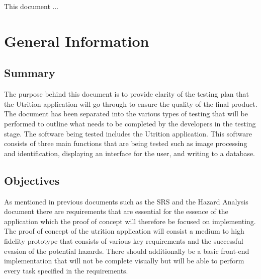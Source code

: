 \documentclass[12pt, titlepage]{article}
\begin{document}
	
	\newpage
	
	
	This document ... 
	
	\section{General Information}
	
	\subsection{Summary}
	
		The purpose behind this document is to provide clarity of the testing plan that the Utrition application will go through to ensure the quality of the final product. The document has been separated into the various types of testing that will be performed to outline what needs to be completed by the developers in the testing stage. The software being tested includes the Utrition application. This software consists of three main functions that are being tested such as image processing and identification, displaying an interface for the user, and writing to a database.
	
	\subsection{Objectives}
	
		
		As mentioned in previous documents such as the SRS and the Hazard Analysis document there are requirements that are essential for the essence of the application which the proof of concept will therefore be focused on implementing. The proof of concept of the utrition application will consist a medium to high fidelity prototype that consists of various key requirements and the successful evasion of the potential hazards. There should additionally be a basic front-end implementation that will not be complete visually but will be able to perform every task specified in the requirements. 
\end{document}
